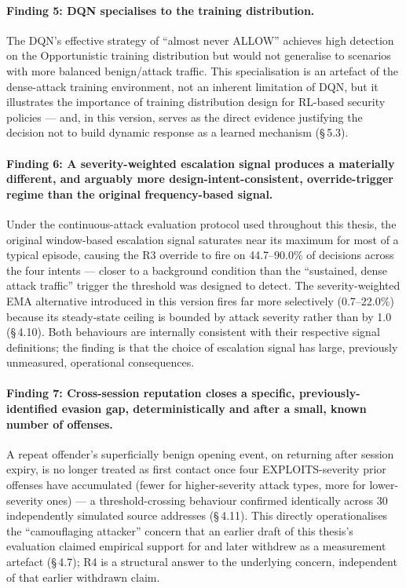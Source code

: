 \paragraph{Finding 5: DQN specialises to the training distribution.}
The DQN's effective strategy of ``almost never ALLOW'' achieves high
detection on the Opportunistic training distribution but would not generalise
to scenarios with more balanced benign/attack traffic.
This specialisation is an artefact of the dense-attack training environment,
not an inherent limitation of DQN, but it illustrates the importance of
training distribution design for RL-based security policies --- and, in this
version, serves as the direct evidence justifying the decision not to build
dynamic response as a learned mechanism (\S\,5.3).

\paragraph{Finding 6: A severity-weighted escalation signal produces a materially different, and arguably more design-intent-consistent, override-trigger regime than the original frequency-based signal.}
Under the continuous-attack evaluation protocol used throughout this thesis,
the original window-based escalation signal saturates near its maximum for
most of a typical episode, causing the R3 override to fire on 44.7--90.0\% of
decisions across the four intents --- closer to a background condition than
the ``sustained, dense attack traffic'' trigger the threshold was designed to
detect.
The severity-weighted EMA alternative introduced in this version fires far
more selectively (0.7--22.0\%) because its steady-state ceiling is bounded by
attack severity rather than by 1.0 (\S\,4.10).
Both behaviours are internally consistent with their respective signal
definitions; the finding is that the choice of escalation signal has large,
previously unmeasured, operational consequences.

\paragraph{Finding 7: Cross-session reputation closes a specific, previously-identified evasion gap, deterministically and after a small, known number of offenses.}
A repeat offender's superficially benign opening event, on returning after
session expiry, is no longer treated as first contact once four
EXPLOITS-severity prior offenses have accumulated (fewer for higher-severity
attack types, more for lower-severity ones) --- a threshold-crossing
behaviour confirmed identically across 30 independently simulated source
addresses (\S\,4.11).
This directly operationalises the ``camouflaging attacker'' concern that an
earlier draft of this thesis's evaluation claimed empirical support for and
later withdrew as a measurement artefact (\S\,4.7); R4 is a structural answer
to the underlying concern, independent of that earlier withdrawn claim.

